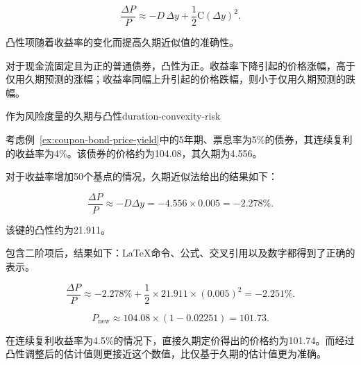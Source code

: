 \begin{equation}
\frac{\Delta P}{P}
\approx
-D\,\Delta y
+
\frac{1}{2}\mathrm{C}(\Delta y)^2.
\label{eq:ch8-duration-convexity-approx}
\end{equation}

凸性项随着收益率的变化而提高久期近似值的准确性。

对于现金流固定且为正的普通债券，凸性为正。收益率下降引起的价格涨幅，高于仅用久期预测的涨幅；收益率同幅上升引起的价格跌幅，则小于仅用久期预测的跌幅。

\begin{example}{作为风险度量的久期与凸性}{duration-convexity-risk}

考虑例~\ref{ex:coupon-bond-price-yield}中的5年期、票息率为5\%的债券，其连续复利的收益率为4\%。该债券的价格约为104.08，其久期为4.556。 

对于收益率增加50个基点的情况，久期近似法给出的结果如下：

\[
\frac{\Delta P}{P}
\approx
-D\Delta y
=
-4.556\times 0.005
=
-2.278\%.
\]

该键的凸性约为21.911。

包含二阶项后，结果如下：LaTeX命令、公式、交叉引用以及数字都得到了正确的表示。

\[
\frac{\Delta P}{P}
\approx
-2.278\%
+
\frac{1}{2}\times 21.911\times (0.005)^2
=
-2.251\%.
\]

\[
P_{\mathrm{new}}
\approx
104.08\times(1-0.02251)
=
101.73.
\]

在连续复利收益率为4.5\%的情况下，直接久期定价得出的价格约为101.74。而经过凸性调整后的估计值则更接近这个数值，比仅基于久期的估计值更为准确。

\end{example}

